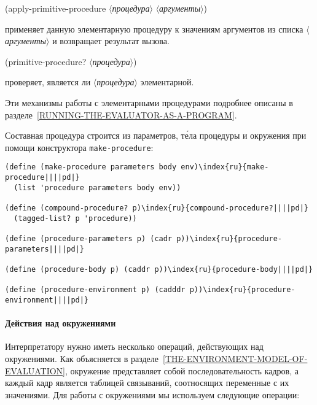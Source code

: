 \begin{plainlist}
\item
{\small (apply-primitive-procedure \textit{$\langle$процедура$\rangle$} \textit{$\langle$аргументы$\rangle$})}

применяет данную элементарную 
процедуру к значениям аргументов из
списка \textit{$\langle$аргументы$\rangle$} и возвращает результат вызова.

\item
{\small (primitive-procedure? \textit{$\langle$процедура$\rangle$})  }

проверяет, является ли \textit{$\langle$процедура$\rangle$} элементарной.
\end{plainlist}
Эти механизмы работы с элементарными процедурами подробнее описаны в
разделе~\ref{RUNNING-THE-EVALUATOR-AS-A-PROGRAM}.

Составная процедура строится из параметров, т\'ела процедуры
и окружения при помощи конструктора {\tt make-procedure}:

\begin{Verbatim}[fontsize=\small]
(define (make-procedure parameters body env)\index{ru}{make-procedure||||pd|}
  (list 'procedure parameters body env))

(define (compound-procedure? p)\index{ru}{compound-procedure?||||pd|}
  (tagged-list? p 'procedure))

(define (procedure-parameters p) (cadr p))\index{ru}{procedure-parameters||||pd|}

(define (procedure-body p) (caddr p))\index{ru}{procedure-body||||pd|}

(define (procedure-environment p) (cadddr p))\index{ru}{procedure-environment||||pd|}
\end{Verbatim}

\paragraph{Действия над окружениями}

Интерпретатору нужно иметь несколько операций,
действующих над окружениями.  Как объясняется в 
разделе~\ref{THE-ENVIRONMENT-MODEL-OF-EVALUATION}, окружение
представляет собой последовательность кадров, а каждый кадр является
таблицей связываний, соотносящих переменные с их значениями.  Для
работы с окружениями мы используем следующие операции:

